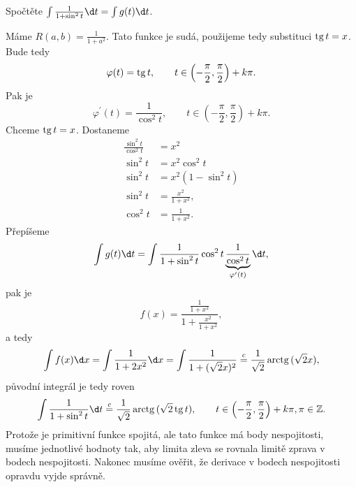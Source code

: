 \begin{priklad}
	Spočtěte $\int \frac{1}{1+\sin^2t}\d t = \int g(t) \d t$.
	\par Máme $R(a,b)=\frac{1}{1+a^2}$. Tato funkce je sudá, použijeme tedy substituci $\operatorname{tg} t = x$. Bude tedy
	$$
	    \varphi(t)=\operatorname{tg} t, \qquad t \in \left( -\frac{\pi}{2}, \frac{\pi}{2} \right )+k\pi.
	$$
	Pak je
	$$
	    \varphi^\prime(t) = \frac{1}{\cos^2 t}, \qquad t \in \left( -\frac{\pi}{2}, \frac{\pi}{2} \right )+k\pi.
	$$
	Chceme $\operatorname{tg} t = x$. Dostaneme
	\begin{align*}
	\frac{\sin^2 t}{\cos^2 t} &= x^2\\
	\sin^2 t &= x^2 \cos ^2 t \\
	\sin^2 t &= x^2 (1-\sin^2 t)\\
	\sin^2 t &= \frac{x^2}{1+x^2},\\
	\cos^2 t &= \frac{1}{1+x^2}.
	\end{align*}
	Přepíšeme
	$$
	\int g(t) \d t = \int \frac{1}{1+\sin^2 t} \cos^2 t \underbrace{\frac{1}{\cos^2 t}}_{\varphi^\prime(t)}\d t,
	$$
	pak je
	$$
	f(x) = \frac{\frac{1}{1+x^2}}{1+\frac{x^2}{1+x^2}},
	$$
	a tedy
	$$
	    \int f(x) \d x = \int \frac{1}{1+2x^2} \d x = \int \frac{1}{1+(\sqrt{2}x)^2} \stackrel{c}{=} \frac{1}{\sqrt{2}}\arctg{(\sqrt{2}x)},
	$$
	původní integrál je tedy roven
	$$
	    \int \frac{1}{1+\sin^2 t} \d t \stackrel{c}{=} \frac{1}{\sqrt{2}} \arctg{(\sqrt{2}\tg{t})}, \qquad t \in \left( -\frac{\pi}{2}, \frac{\pi}{2} \right )+k\pi, \pi \in \mathbb Z .
	$$
	Protože je primitivní funkce spojitá, ale tato funkce má body nespojitosti, musíme jednotlivé
	hodnoty  tak, aby limita zleva se rovnala limitě zprava v bodech nespojitosti.
	Nakonec musíme ověřit, že derivace v bodech nespojitosti opravdu vyjde správně.
\end{priklad}

